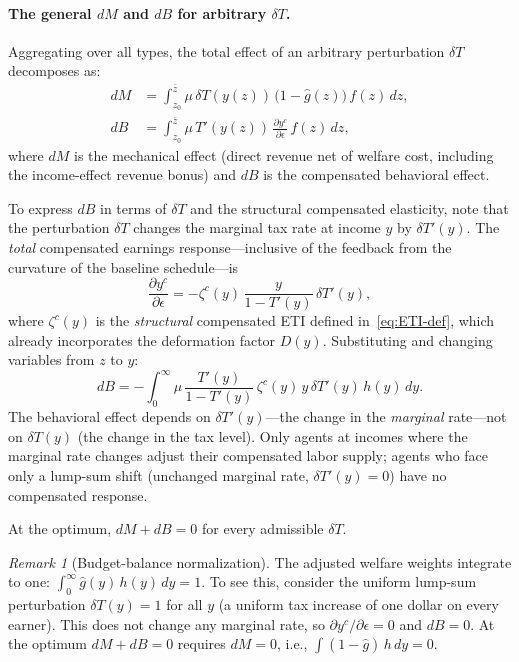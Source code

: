 \documentclass[12pt,a4paper]{article}
\theoremstyle{definition}
\theoremstyle{plain}
\theoremstyle{remark}
\newtheorem{remark}{Remark}[section]
\newcommand{\zbar}{\bar{z}}
\newcommand{\zlow}{z_{\scriptscriptstyle 0}}
\begin{document}
\paragraph{The general $dM$ and $dB$ for arbitrary $\delta T$.}
Aggregating over all types, the total effect of an arbitrary perturbation $\delta T$ decomposes as:
\begin{align}
  dM &= \int_{\zlow}^{\zbar} \mu\,\delta T(y(z))\,\bigl(1 - \hat g(z)\bigr)\,f(z)\,dz,
  \label{eq:dM-general} \\
  dB &= \int_{\zlow}^{\zbar} \mu\,T'(y(z))\,\frac{\partial y^c}{\partial\epsilon}\,f(z)\,dz,
  \label{eq:dB-general}
\end{align}
where $dM$ is the mechanical effect (direct revenue net of welfare cost, including the income-effect revenue bonus) and $dB$ is the compensated behavioral effect.

To express $dB$ in terms of $\delta T$ and the structural compensated elasticity, note that the perturbation $\delta T$ changes the marginal tax rate at income $y$ by $\delta T'(y)$. The \emph{total} compensated earnings response---inclusive of the feedback from the curvature of the baseline schedule---is
\[
  \frac{\partial y^c}{\partial\epsilon} = -\zeta^c(y)\,\frac{y}{1-T'(y)}\,\delta T'(y),
\]
where $\zeta^c(y)$ is the \emph{structural} compensated ETI defined in~\eqref{eq:ETI-def}, which already incorporates the deformation factor $D(y)$. Substituting and changing variables from $z$ to $y$:
\begin{equation}
\label{eq:dB-general-explicit}
  dB = -\int_0^{\infty} \mu\,\frac{T'(y)}{1-T'(y)}\,\zeta^c(y)\,y\,\delta T'(y)\,h(y)\,dy.
\end{equation}
The behavioral effect depends on $\delta T'(y)$---the change in the \emph{marginal} rate---not on $\delta T(y)$ (the change in the tax level). Only agents at incomes where the marginal rate changes adjust their compensated labor supply; agents who face only a lump-sum shift (unchanged marginal rate, $\delta T'(y) = 0$) have no compensated response.

At the optimum, $dM + dB = 0$ for every admissible $\delta T$.

\begin{remark}[Budget-balance normalization]
\label{rem:budget_balance}
The adjusted welfare weights integrate to one: $\int_0^\infty \hat g(y)\,h(y)\,dy = 1$. To see this, consider the uniform lump-sum perturbation $\delta T(y) = 1$ for all $y$ (a uniform tax increase of one dollar on every earner). This does not change any marginal rate, so $\partial y^c/\partial\epsilon = 0$ and $dB = 0$. At the optimum $dM + dB = 0$ requires $dM = 0$, i.e., $\int (1 - \hat g)\,h\,dy = 0$.
\end{remark}
\end{document}
